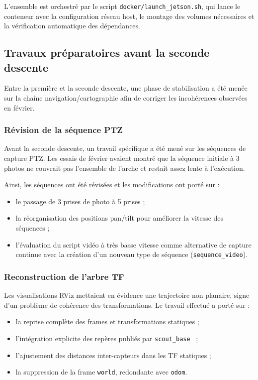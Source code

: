 \documentclass[12pt,a4paper]{article}
\begin{document}
L'ensemble est orchestré par le script \texttt{docker/launch\_jetson.sh}, qui lance le conteneur avec la configuration réseau host, le montage des volumes nécessaires et la vérification automatique des dépendances.

\subsection{Travaux préparatoires avant la seconde descente}

Entre la première et la seconde descente, une phase de stabilisation a été menée sur la chaîne navigation/cartographie afin de corriger les incohérences observées en février.

\subsubsection{Révision de la séquence PTZ}

Avant la seconde descente, un travail spécifique a été mené sur les séquences de capture PTZ. Les essais de février avaient montré que la séquence initiale à 3 photos ne couvrait pas l'ensemble de l'arche et restait assez lente à l'exécution.

Ainsi, les séquences ont été révisées et les modifications ont porté sur :
\begin{itemize}
    \item le passage de 3 prises de photo à 5 prises ;
    \item la réorganisation des positions pan/tilt pour améliorer la vitesse des séquences ;
    \item l'évaluation du script vidéo à très basse vitesse comme alternative de capture continue avec la création d'un nouveau type de séquence (\texttt{sequence\_video}).
\end{itemize}

\subsubsection{Reconstruction de l'arbre TF}

Les visualisations RViz mettaient en évidence une trajectoire non planaire, signe d'un problème de cohérence des transformations. Le travail effectué a porté sur :
\begin{itemize}
    \item la reprise complète des frames et transformations statiques ;
    \item l'intégration explicite des repères publiés par \texttt{scout\_base}~\cite{scout_ros2} ;
    \item l'ajustement des distances inter-capteurs dans les TF statiques ;
    \item la suppression de la frame \texttt{world}, redondante avec \texttt{odom}.
\end{itemize}
\end{document}
